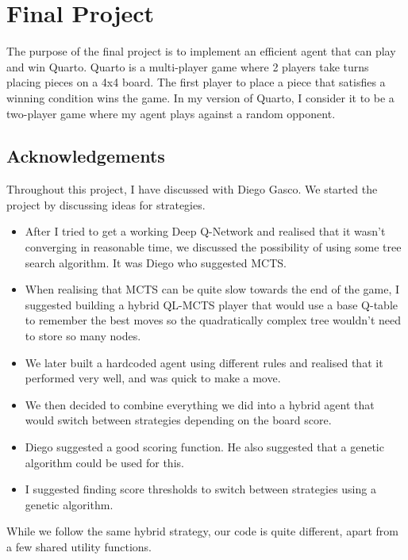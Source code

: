 
\section{Final Project}

The purpose of the final project is to implement an efficient agent that can play and win Quarto. Quarto is a multi-player game where 2 players take turns placing pieces on a 4x4 board. The first player to place a piece that satisfies a winning condition wins the game. In my version of Quarto, I consider it to be a two-player game where my agent plays against a random opponent.

\subsection{Acknowledgements}

Throughout this project, I have discussed with Diego Gasco. We started the project by discussing ideas for strategies.

\begin{itemize}
    \item After I tried to get a working Deep Q-Network and realised that it wasn't converging in reasonable time, we discussed the possibility of using some tree search algorithm. It was Diego who suggested MCTS.
    \item When realising that MCTS can be quite slow towards the end of the game, I suggested building a hybrid QL-MCTS player that would use a base Q-table to remember the best moves so the quadratically complex tree wouldn't need to store so many nodes.
    \item We later built a hardcoded agent using different rules and realised that it performed very well, and was quick to make a move.
    \item We then decided to combine everything we did into a hybrid agent that would switch between strategies depending on the board score.
    \item Diego suggested a good scoring function. He also suggested that a genetic algorithm could be used for this.
    \item I suggested finding score thresholds to switch between strategies using a genetic algorithm.
\end{itemize}

While we follow the same hybrid strategy, our code is quite different, apart from a few shared utility functions.


